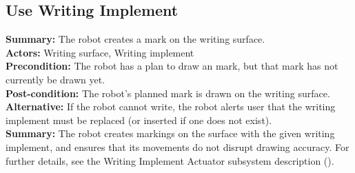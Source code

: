 \subsection{Use Writing Implement}
\textbf{Summary:} The robot creates a mark on the writing surface. \\
\textbf{Actors:} Writing surface, Writing implement \\
\textbf{Precondition:} The robot has a plan to draw an mark, but that mark has not currently be drawn yet. \\
\textbf{Post-condition:} The robot's planned mark is drawn on the writing surface. \\
\textbf{Alternative:} If the robot cannot write, the robot alerts user that the writing implement must be replaced (or inserted if one does not exist). \\
\textbf{Summary:} The robot creates markings on the surface with the given writing implement, and ensures that its movements do not disrupt drawing accuracy. For further details, see the Writing Implement Actuator subsystem description ().\\
